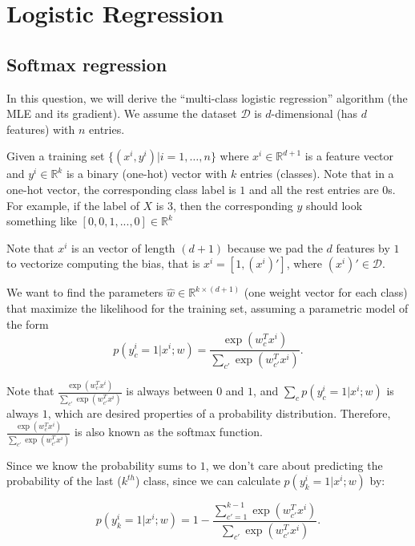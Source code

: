 \newpage
\section{Logistic Regression }

\subsection{Softmax regression }

In this question, we will derive the ``multi-class logistic regression'' algorithm (the MLE and its gradient).
We assume the dataset $\mathcal{D}$ is $d$-dimensional (has $d$ features) with $n$ entries. 

Given a training set $\{(x^i, y^i) | i = 1, \ldots, n \}$ where $x^i \in \mathbb{R}^{d+1}$ is a feature vector and $y^i\in \mathbb{R}^k$ is a binary (one-hot) vector with $k$ entries (classes). Note that in a one-hot vector, the corresponding class label is $1$ and all the rest entries are $0$s. For example, if the label of $X$ is $3$, then the corresponding $y$ should look something like $[0,0,1,...,0]\in \mathbb{R}^k$

Note that $x^i$ is an vector of length $(d+1)$ because we pad the $d$ features by $1$ to vectorize computing the bias, that is $x^i = [1, (x^i)']$, where $(x^i)' \in \mathcal{D}$. 

We want to find the parameters $\hat{w} \in \mathbb{R}^{k\times (d+1)}$ (one weight vector for each class) that maximize the likelihood for the training set, assuming a parametric model of the form
\begin{equation}
    p(y_c^i = 1 | x^i; w)
    =\frac{\exp(w_c^T x^i)}{\sum_{c'}\exp(w_{c'}^T x^i)}.
\end{equation}

Note that $\frac{\exp(w_c^T x^i)}{\sum_{c'}\exp(w_{c'}^T x^i)}$ is always between $0$ and $1$, and $\sum_c p(y_c^i = 1 | x^i; w)$ is always $1$, which are desired properties of a probability distribution. Therefore, $\frac{\exp(w_c^T x^i)}{\sum_{c'}\exp(w_{c'}^T x^i)}$ is also known as the softmax function.

Since we know the probability sums to $1$, we don't care about predicting the probability of the last ($k^{th}$) class, since we can calculate $p(y_k^i = 1 | x^i; w)$ by:

\begin{equation}
    p(y_k^i = 1 | x^i; w)
    =1 - \frac{\sum_{c'=1}^{k-1}\exp(w_{c'}^T x^i)}{\sum_{c'}\exp(w_{c'}^T x^i)}.
\end{equation}

